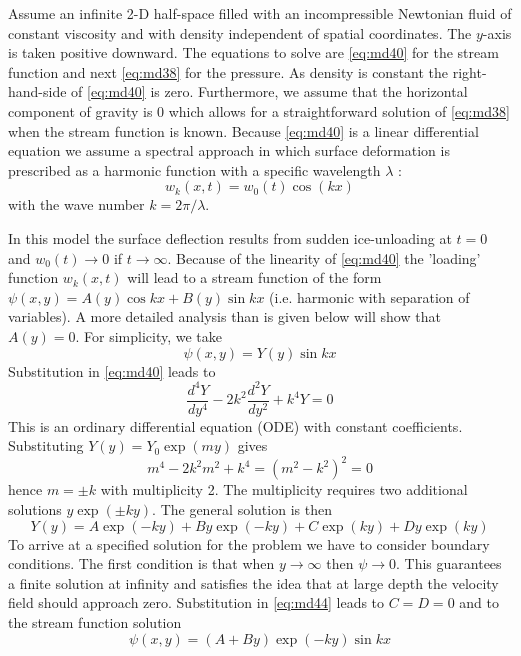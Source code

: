 Assume an infinite 2-D half-space filled with an incompressible Newtonian fluid of
constant viscosity and with density independent of spatial coordinates. The $y$-axis is taken
positive downward. The equations to solve are \eqref{eq:md40} for the stream function and next \eqref{eq:md38}
for the pressure. As density is constant the right-hand-side of \eqref{eq:md40} is zero. Furthermore,
we assume that the horizontal component of gravity is 0 which allows for a
straightforward solution of \eqref{eq:md38} when the stream function is known.
Because \eqref{eq:md40} is a linear differential equation we assume a spectral approach in which
surface deformation is prescribed as a harmonic function with a specific wavelength $\lambda$ :
\begin{equation}
w_k(x,t) = w_0(t) \cos (kx) 
\label{eq:md41}
\end{equation}
with the wave number $k = 2\pi /\lambda$.




In this model the surface deflection results from sudden ice-unloading at $t=0$ and
$w_0(t)\rightarrow 0$ if $t\rightarrow\infty$. 
Because of the linearity of \eqref{eq:md40} the 'loading' function $w_k(x,t)$ will
lead to a stream function of the form $\psi(x,y)=A(y) \cos kx + B(y) \sin kx$ (i.e. harmonic
with separation of variables). A more detailed analysis than is given below will show
that $A(y) =0$. For simplicity, we take
\begin{equation}
\psi(x,y)=Y(y) \sin kx
\label{eq:md42}
\end{equation}
Substitution in \eqref{eq:md40} leads to
\begin{equation}
\frac{d^4Y}{dy^4} - 2k^2 \frac{d^2Y}{dy^2} + k^4 Y = 0
\label{eq:md43}
\end{equation}
This is an ordinary differential equation (ODE) 
with constant coefficients. Substituting 
$Y(y)=Y_0 \exp (m y)$ gives 
\[
m^4 - 2k^2 m^2 + k^4 = (m^2-k^2)^2=0
\]
hence $m=\pm k$ with multiplicity 2.
The multiplicity requires two additional solutions $y \exp (\pm ky)$. The general solution is then
\begin{equation}
Y(y) = A \exp (-ky) + By \exp(-ky) + C \exp (ky) + Dy\exp (ky)
\label{eq:md44}
\end{equation}
To arrive at a specified solution for the problem we have to consider boundary
conditions. The first condition is that when $y\rightarrow\infty$ then $\psi\rightarrow 0$. 
This guarantees a finite
solution at infinity and satisfies the idea that at large depth the velocity field should
approach zero. Substitution in \eqref{eq:md44} leads to $C=D=0$ and to the stream function
solution
\begin{equation}
\psi(x,y) = (A+By )\exp (-ky) \sin kx 
\label{eq:md45}
\end{equation}

